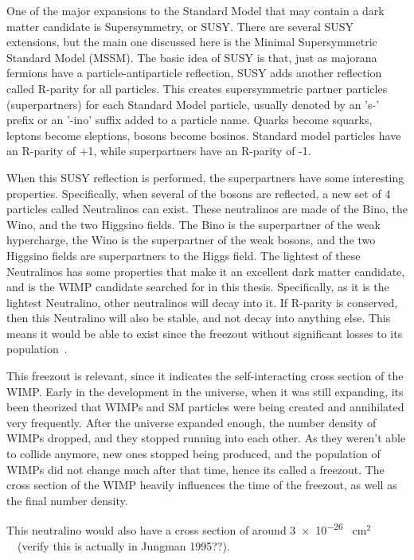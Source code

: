   One of the major expansions to the Standard Model that may contain a dark matter candidate is Supersymmetry, or SUSY.
  There are several SUSY extensions, but the main one discussed here is the Minimal Supersymmetric Standard Model (MSSM).
  The basic idea of SUSY is that, just as majorana fermions have a particle-antiparticle reflection, SUSY adds another reflection called R-parity for all particles. 
  This creates supersymmetric partner particles (superpartners) for each Standard Model particle, usually denoted by an 's-' prefix or an '-ino' suffix added to a particle name.
  Quarks become squarks, leptons become sleptions, bosons become bosinos.
  Standard model particles have an R-parity of +1, while superpartners have an R-parity of -1.
    
  When this SUSY reflection is performed, the superpartners have some interesting properties.
  Specifically, when several of the bosons are reflected, a new set of 4 particles called Neutralinos can exist.
  These neutralinos are made of the Bino, the Wino, and the two Higgsino fields.
  The Bino is the superpartner of the weak hypercharge, the Wino is the superpartner of the weak bosons, and the two Higgsino fields are superpartners to the Higgs field.
  The lightest of these Neutralinos has some properties that make it an excellent dark matter candidate, and is the WIMP candidate searched for in this thesis.
  Specifically, as it is the lightest Neutralino, other neutralinos will decay into it.
  If R-parity is conserved, then this Neutralino will also be stable, and not decay into anything else.
  This means it would be able to exist since the freezout without significant losses to its population~\cite{neutralino1,neutralino2,neutralino3}.
  
  This freezout is relevant, since it indicates the self-interacting cross section of the WIMP.
  Early in the development in the universe, when it was still expanding, its been theorized that WIMPs and SM particles were being created and annihilated very frequently.
  After the universe expanded enough, the number density of WIMPs dropped, and they stopped running into each other.
  As they weren't able to collide anymore, new ones stopped being produced, and the population of WIMPs did not change much after that time, hence its called a freezout.
  The cross section of the WIMP heavily influences the time of the freezout, as well as the final number density.
  
  This neutralino would also have a cross section of around \nicetilde{} \SI{3e-26}{ cm${}^2$ }~\cite{Jungman:1995df} {\color{red}(verify this is actually in Jungman 1995??)}.
  
